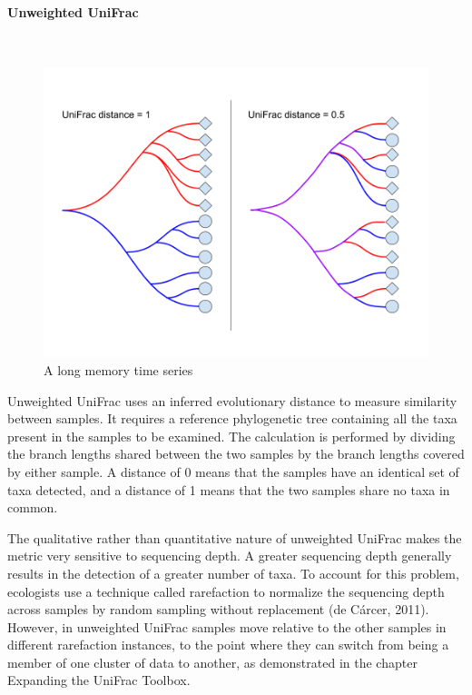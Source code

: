 \paragraph{Unweighted UniFrac}\mbox{}\\

\begin{figure}[h]
\begin{center}
\includegraphics[width=\textwidth]{unifrac.png}
\caption{A long memory time series\label{ts1}}
\end{center}
\end{figure}

Unweighted UniFrac uses an inferred evolutionary distance to measure similarity between samples. It requires a reference phylogenetic tree containing all the taxa present in the samples to be examined. The calculation is performed by dividing the branch lengths shared between the two samples by the branch lengths covered by either sample. A distance of 0 means that the samples have an identical set of taxa detected, and a distance of 1 means that the two samples share no taxa in common.

The qualitative rather than quantitative nature of unweighted UniFrac makes the metric very sensitive to sequencing depth. A greater sequencing depth generally results in the detection of a greater number of taxa. To account for this problem, ecologists use a technique called rarefaction to normalize the sequencing depth across samples by random sampling without replacement (de Cárcer, 2011). However, in unweighted UniFrac samples move relative to the other samples in different rarefaction instances, to the point where they can switch from being a member of one cluster of data to another, as demonstrated in the chapter Expanding the UniFrac Toolbox.

